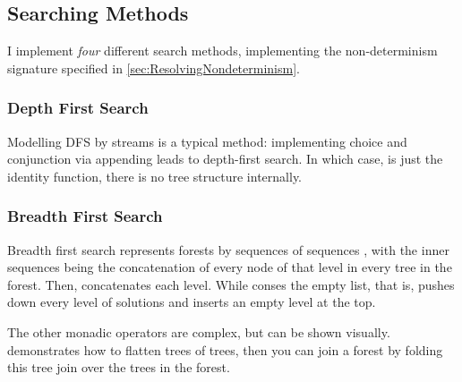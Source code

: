 \subsection{Searching Methods}\label{sec:SearchMethods}
I implement \textit{four} different search methods, implementing the non-determinism signature specified in \cref{sec:ResolvingNondeterminism}.

\subsubsection{Depth First Search}
Modelling DFS by streams is a typical method: implementing choice and conjunction via appending leads to depth-first search. In which case,  is just the identity function, there is no tree structure internally.

\subsubsection{Breadth First Search}
Breadth first search represents forests by sequences of sequences \cite{BFSCombinators}, with the inner sequences being the concatenation of every node of that level in every tree in the forest. Then,  concatenates each level. While  conses the empty list, that is, pushes down every level of solutions and inserts an empty level at the top.

The other monadic operators are complex, but  can be shown visually.  demonstrates how to flatten trees of trees, then you can join a forest by folding this tree join over the trees in the forest.

